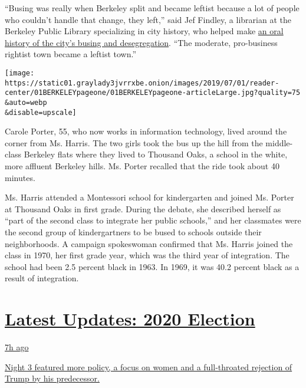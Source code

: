 ``Busing was really when Berkeley split and became leftist because a lot
of people who couldn't handle that change, they left,'' said Jef
Findley, a librarian at the Berkeley Public Library specializing in city
history, who helped make
\href{https://www.youtube.com/results?q=berkeley+public+desegregation}{an
oral history of the city's busing and desegregation}. ``The moderate,
pro-business rightist town became a leftist town.''

\texttt{[image: https://static01.graylady3jvrrxbe.onion/images/2019/07/01/reader-center/01BERKELEYpageone/01BERKELEYpageone-articleLarge.jpg?quality=75\\\&auto=webp\\\&disable=upscale]}

Carole Porter, 55, who now works in information technology, lived around
the corner from Ms. Harris. The two girls took the bus up the hill from
the middle-class Berkeley flats where they lived to Thousand Oaks, a
school in the white, more affluent Berkeley hills. Ms. Porter recalled
that the ride took about 40 minutes.

Ms. Harris attended a Montessori school for kindergarten and joined Ms.
Porter at Thousand Oaks in first grade. During the debate, she described
herself as ``part of the second class to integrate her public schools,''
and her classmates were the second group of kindergartners to be bused
to schools outside their neighborhoods. A campaign spokeswoman confirmed
that Ms. Harris joined the class in 1970, her first grade year, which
was the third year of integration. The school had been 2.5 percent black
in 1963. In 1969, it was 40.2 percent black as a result of integration.

\hypertarget{latest-updates-2020-election}{%
\section{\texorpdfstring{\href{https://www.nytimes3xbfgragh.onion/live/2020/08/19/us/dnc-convention-election?action=click\&pgtype=Article\&state=default\&region=MAIN_CONTENT_1\&context=storylines_live_updates}{Latest
Updates: 2020
Election}}{Latest Updates: 2020 Election}}\label{latest-updates-2020-election}}

\href{https://www.nytimes3xbfgragh.onion/live/2020/08/19/us/dnc-convention-election?action=click\&pgtype=Article\&state=default\&region=MAIN_CONTENT_1\&context=storylines_live_updates\#night-3-featured-more-policy-a-focus-on-women-and-a-full-throated-rejection-of-trump-by-his-predecessor}{7h
ago}

\href{https://www.nytimes3xbfgragh.onion/live/2020/08/19/us/dnc-convention-election?action=click\&pgtype=Article\&state=default\&region=MAIN_CONTENT_1\&context=storylines_live_updates\#night-3-featured-more-policy-a-focus-on-women-and-a-full-throated-rejection-of-trump-by-his-predecessor}{Night
3 featured more policy, a focus on women and a full-throated rejection
of Trump by his predecessor.}

